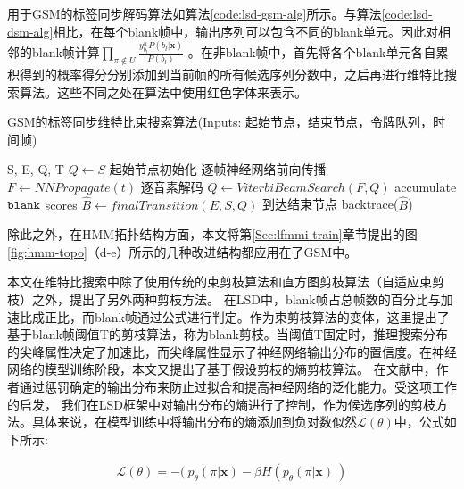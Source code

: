 用于GSM的标签同步解码算法如算法\ref{code:lsd-gsm-alg}所示。与算法\ref{code:lsd-dsm-alg}相比，在每个blank帧中，输出序列可以包含不同的blank单元。因此对相邻的blank帧计算$\prod_{\pi\not\in U}\frac{y_{b_l}^u P(b_l|\mathbf{x})}{P(b_l)}$ 。在非blank帧中，首先将各个blank单元各自累积得到的概率得分分别添加到当前帧的所有候选序列分数中，之后再进行维特比搜索算法。这些不同之处在算法中使用红色字体来表示。


\begin{algorithm}[ht]
\caption{GSM的标签同步维特比束搜索算法\textcolor[rgb]{0,0.5,0}{(Inputs: 起始节点，结束节点，令牌队列，时间帧)}}
\label{code:lsd-gsm-alg}
\begin{algorithmic}[1]
 {S, E, Q, T}
\State $Q \leftarrow S$ \Comment \textcolor[rgb]{0,0.5,0}{起始节点初始化}
    \Comment \textcolor[rgb]{0,0.5,0}{逐帧神经网络前向传播}
\State $F \leftarrow NNPropagate(t)$
    \Comment \textcolor[rgb]{0,0.5,0}{逐音素解码}
\State  {\color{red}{$F \leftarrow addAccumulatedBlankScore(V,F)$ }}
\State  {\color{red}{$reset(V)$ }}
\State  $Q\leftarrow ViterbiBeamSearch(F, Q)$
\Else         \Comment \textcolor[rgb]{0,0.5,0}{accumulate $\tt blank$ scores}
\State  {\color{red}{$V \leftarrow accumulateBlankScore(V,F)$ }}
\EndIf
\EndFor
\State $\hat B\leftarrow finalTransition(E,S,Q)$ \Comment \textcolor[rgb]{0,0.5,0}{到达结束节点}
\State backtrace($\hat B$)
\EndProcedure
\end{algorithmic}
\end{algorithm}


除此之外，在HMM拓扑结构方面，本文将第\ref{Sec:lfmmi-train}章节提出的图\ref{fig:hmm-topo}（d-e）所示的几种改进结构都应用在了GSM中。

本文在维特比搜索中除了使用传统的束剪枝算法\cite{forney1973viterbi}和直方图剪枝算法\cite{steinbiss1994improvements}（自适应束剪枝\cite{van1996adaptive}）之外，提出了另外两种剪枝方法。 在LSD中，blank帧占总帧数的百分比与加速比成正比，而blank帧通过公式进行判定。作为束剪枝算法的变体，这里提出了基于blank帧阈值T的剪枝算法，称为blank剪枝。当阈值T固定时，推理搜索分布的尖峰属性决定了加速比，而尖峰属性显示了神经网络输出分布的置信度。在神经网络的模型训练阶段，本文又提出了基于假设剪枝的熵剪枝算法。 在文献\cite{pereyra2017regularizing}中，作者通过惩罚确定的输出分布来防止过拟合和提高神经网络的泛化能力。受这项工作的启发， 我们在LSD框架中对输出分布的熵进行了控制，作为候选序列的剪枝方法。具体来说，在模型训练中将输出分布的熵添加到负对数似然$\mathcal{L}(\theta)$中，公式如下所示:
  
\begin{equation}
\label{equ:ent-pen-model}
\begin{split}
\mathcal{L}(\theta)= - (\ p_\theta (\pi|\mathbf{x}) - \beta H(p_\theta (\pi|\mathbf{x})\ )
\end{split}
\end{equation}

